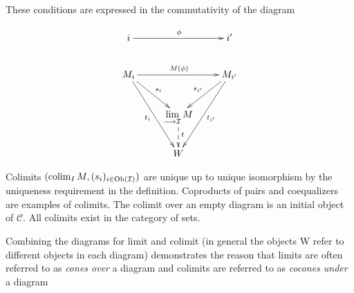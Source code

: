 
\begin{frame}
\noindent These conditions are expressed in the commutativity of the diagram

\begin{displaymath}
\xymatrix{
i \ar[rr]^{\phi} & & i' \\
M_i \ar[rd]^{s_i} \ar[rdd]_{t_i} \ar[rr]^{M(\phi)} & & M_{i'} \ar[ldd]^{t_{i'}} \ar[ld]_{s_{i'}}\\
& \lim\limits_{\longrightarrow \mathcal{I}} M \ar@{-->}[d]^{t}& \\
& W &
}
\end{displaymath}
\end{frame}

\begin{frame}
\noindent
Colimits $(\mathop{\rm colim}\nolimits_I M, (s_i)_{i\in \mathop{\rm Ob}\nolimits(\mathcal{I})})$ are unique up to unique isomorphism by the uniqueness requirement in the definition. Coproducts of pairs and coequalizers are examples of colimits. The colimit over an empty diagram is an initial object of $\mathcal{C}$. All colimits exist in the category of sets.
\end{frame}

\begin{frame}
Combining the diagrams for limit and colimit (in general the objects W refer to different objects in each diagram) demonstrates the reason that limits are often referred to as {\it cones over} a diagram and colimits are referred to as {\it cocones under} a diagram
\end{frame}

